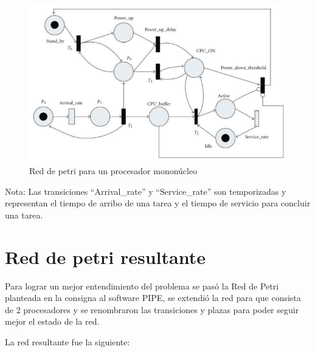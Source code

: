 \documentclass[a4paper,11pt]{article}
\begin{document}
    \begin{figure}[H]
        \centering
        \includegraphics[width=1\textwidth]{images/enunciado_red_mononucleo.jpg}
        \caption{Red de petri para un procesador mononúcleo}
        \label{fig:procesador_mononucleo}
    \end{figure}
    
    \small{Nota: Las transiciones “Arrival\_rate” y “Service\_rate” son temporizadas y representan el
    tiempo de arribo de una tarea y el tiempo de servicio para concluir una tarea.}
    
    \section{Red de petri resultante}
    Para lograr un mejor entendimiento del problema se pasó la Red de Petri planteada en la consigna
    al software PIPE, se extendió la red para que consista de 
    2 procesadores y se renombraron las transiciones y plazas 
    para poder seguir mejor el estado de la red.
    
    La red resultante fue la siguiente:
    
\end{document}
